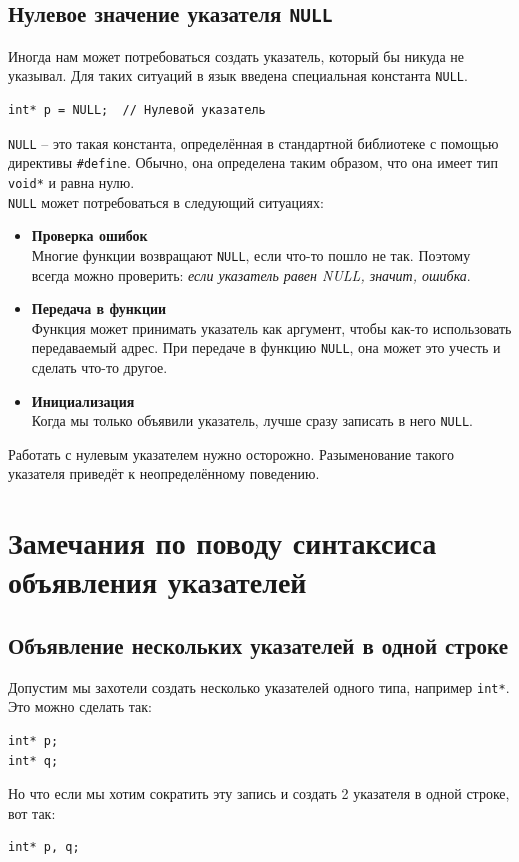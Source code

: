 \documentclass[10pt]{article}
\begin{document}
\subsection*{Нулевое значение указателя \texttt{NULL}}
Иногда нам может потребоваться создать указатель, который бы никуда не указывал. Для таких ситуаций в язык введена специальная константа \texttt{NULL}.
\begin{lstlisting}
int* p = NULL;  // Нулевой указатель
\end{lstlisting}
\texttt{NULL} -- это такая константа, определённая в стандартной библиотеке с помощью директивы \texttt{\#define}. Обычно, она определена таким образом, что она имеет тип \texttt{void*} и равна нулю.\\
\texttt{NULL} может потребоваться в следующий ситуациях:
\begin{itemize}
\item \textbf{Проверка ошибок}\\
Многие функции возвращают \texttt{NULL}, если что-то пошло не так.
Поэтому всегда можно проверить: \textit{если указатель равен NULL, значит, ошибка}.

\item \textbf{Передача в функции}\\
Функция может принимать указатель как аргумент, чтобы как-то использовать передаваемый адрес. При передаче в функцию \texttt{NULL}, она может это учесть и сделать что-то другое.

\item \textbf{Инициализация}\\
Когда мы только объявили указатель, лучше сразу записать в него \texttt{NULL}.
\end{itemize}
Работать с нулевым указателем нужно осторожно. Разыменование такого указателя приведёт к неопределённому поведению.


\newpage
\section*{Замечания по поводу синтаксиса объявления указателей}
\subsection*{Объявление нескольких указателей в одной строке}
Допустим мы захотели создать несколько указателей одного типа, например \texttt{int*}. Это можно сделать так:
\begin{lstlisting}
int* p;
int* q;
\end{lstlisting}
Но что если мы хотим сократить эту запись и создать 2 указателя в одной строке, вот так:
\begin{lstlisting}
int* p, q;
\end{lstlisting}
\end{document}
